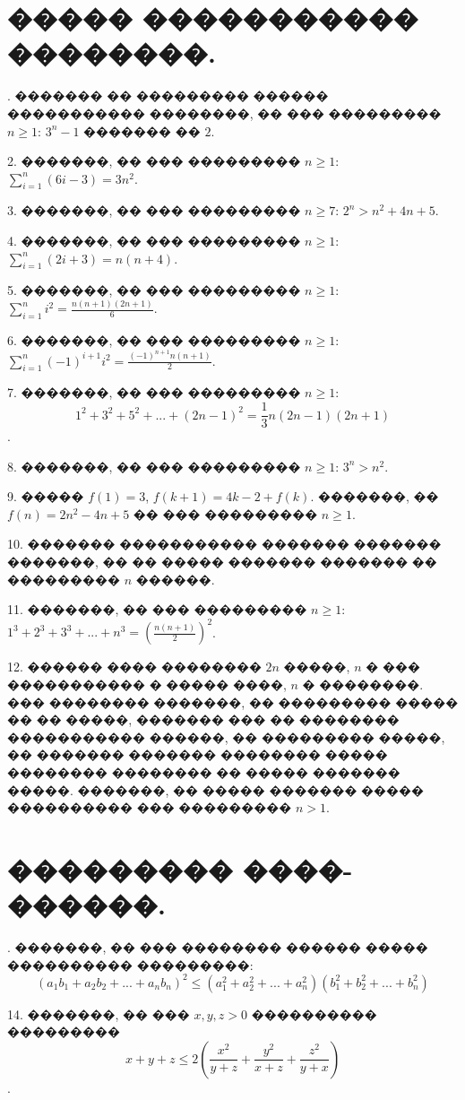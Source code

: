 \documentclass[a4paper,12pt]{article}
\begin{document}

\begin{large}

\section*{����� ����������� ��������.}

. ������� �� ��������� ������ ����������� ��������, �� ��� ��������� $n\geq 1$: $3^{n}-1$ ������� �� $2$.

2. �������, �� ��� ��������� $n\geq 1$: $\sum\limits_{i=1}^{n}(6i-3) = 3n^{2}$.

3. �������, �� ��� ��������� $n\geq 7$: $2^{n}>n^{2}+4n+5$.

4. �������, �� ��� ��������� $n\geq 1$: $\sum\limits_{i=1}^{n}(2i+3) = n(n+4)$.

5. �������, �� ��� ��������� $n\geq 1$: $\sum\limits_{i=1}^{n}i^{2} = \frac{n(n+1)(2n+1)}{6}$.

6. �������, �� ��� ��������� $n\geq 1$: $\sum\limits_{i=1}^{n}(-1)^{i+1}i^{2} = \frac{(-1)^{n+1}n(n+1)}{2}$.

7. �������, �� ��� ��������� $n\geq 1$: $$1^{2}+3^{2}+5^{2}+...+(2n-1)^{2} = \frac{1}{3}n(2n-1)(2n+1)$$.

8. �������, �� ��� ��������� $n\geq 1$: $3^{n}>n^{2}$.

9. ����� $f(1)=3$, $f(k+1)=4k-2+f(k)$. �������, �� $f(n)=2n^{2}-4n+5$ �� ��� ��������� $n\geq 1$.

10. ������� ����������� ������� ������� �������, �� �� ����� ������� ������� �� ��������� $n$ ������.

11. �������, �� ��� ��������� $n\geq 1$: $1^{3}+2^{3}+3^{3}+...+n^{3} = (\frac{n(n+1)}{2})^{2}$.

12. ������ ���� �������� $2n$ �����, $n$ � ��� ����������� � ����� ����, $n$ � ��������. ��� �������� �������, �� ��������� ����� �� �� �����, ������� ��� �� �������� ����������� ������, �� ��������� �����, �� ������� ������� �������� ����� �������� �������� �� ����� ������� �����. �������, �� ����� ������� ����� ���������� ��� ��������� $n>1$.


\section*{��������� ����-������.}

. �������, �� ��� �������� ������ ����� ���������� ���������: $$(a_{1}b_{1}+a_{2}b_{2}+...+a_{n}b_{n})^{2}\leq (a_{1}^{2}+a_{2}^{2}+...+a_{n}^{2})(b_{1}^{2}+b_{2}^{2}+...+b_{n}^{2})$$

14. �������, �� ��� $x,y,z>0$ ���������� ��������� $$x+y+z\leq 2(\frac{x^{2}}{y+z}+\frac{y^{2}}{x+z}+\frac{z^{2}}{y+x})$$.

\end{large}
\end{document}
